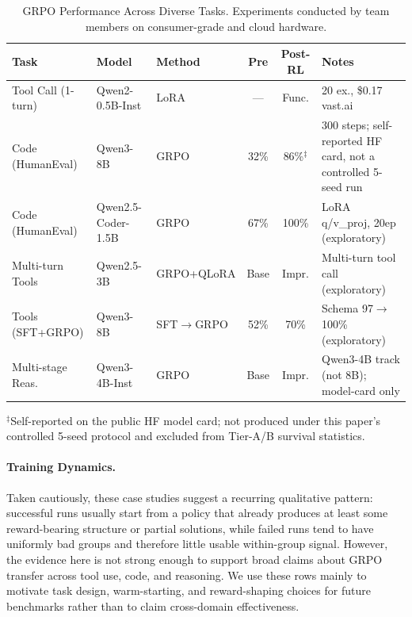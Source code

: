 \documentclass{article}
\begin{document}
\begin{table}[t]
\centering
\caption{GRPO Performance Across Diverse Tasks. Experiments conducted by team members
on consumer-grade and cloud hardware.}
\label{tab:task_grpo}
\footnotesize
\begin{tabular}{@{}l l l c c p{2.8cm}@{}}
\toprule
\textbf{Task} & \textbf{Model} & \textbf{Method} & \textbf{Pre} & \textbf{Post-RL} & \textbf{Notes} \\
\midrule
Tool Call (1-turn) & Qwen2-0.5B-Inst & LoRA & --- & Func. & 20 ex., \$0.17 vast.ai \\
Code (HumanEval) & Qwen3-8B & GRPO & 32\% & 86\%$^{\ddagger}$ & 300 steps; self-reported HF card, not a controlled 5-seed run \\
Code (HumanEval) & Qwen2.5-Coder-1.5B & GRPO & 67\% & 100\% & LoRA q/v\_proj, 20ep (exploratory) \\
Multi-turn Tools & Qwen2.5-3B & GRPO+QLoRA & Base & Impr. & Multi-turn tool call (exploratory) \\
Tools (SFT+GRPO) & Qwen3-8B & SFT$\to$GRPO & 52\% & 70\% & Schema 97$\to$100\% (exploratory) \\
Multi-stage Reas. & Qwen3-4B-Inst & GRPO & Base & Impr. & Qwen3-4B track (not 8B); model-card only \\
\bottomrule
\end{tabular}

\vspace{2pt}
{\scriptsize $^{\ddagger}$Self-reported on the public HF model card; not produced under this paper's controlled 5-seed protocol and excluded from Tier-A/B survival statistics.}

\end{table}

\paragraph{Training Dynamics.}
Taken cautiously, these case studies suggest a recurring qualitative pattern:
successful runs usually start from a policy that already produces at least some
reward-bearing structure or partial solutions, while failed runs tend to have
uniformly bad groups and therefore little usable within-group signal.
However, the evidence here is not strong enough to support broad claims about
GRPO transfer across tool use, code, and reasoning. We use these rows mainly
to motivate task design, warm-starting, and reward-shaping choices for future
benchmarks rather than to claim cross-domain effectiveness.
\end{document}
